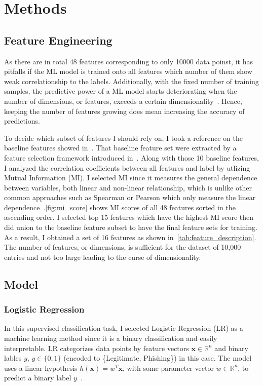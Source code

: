 \section{Methods}\label{sec:method}

\subsection{Feature Engineering}
As there are in total 48 features corresponding to only 10000 data poinst, it has pitfalls
if the ML model is trained onto all features which number of them show weak correlationship to
the labels. Additionally, with the fixed number of training samples, the predictive
power of a ML model starts deteriorating when the number of dimensions, or features, exceeds
a certain dimensionality~\cite{problem-dimension}. Hence, keeping the number of features growing
does mean increasing the accuracy of predictions.

To decide which subset of features I should rely on, I took a reference on the baseline features
showed in~\cite{CHIEW2019153}. That baseline feature set were extracted by a feature selection
framework introduced in~\cite{CHIEW2019153}. Along with those 10 baseline features, I analyzed
the correlation coefficients between all features and label by utlizing Mutual Information (MI).
I selected MI since it measures the general dependence between variables, both linear and non-linear
relationship, which is unlike other common approaches such as Spearman or Pearson which only measure
the linear dependence~\cite{MI-score}.\autoref{fig:mi_score} shows MI scores of all 48 features
sorted in the ascending order. I selected top 15 features which have the highest MI score then did
union to the baseline feature subset to have the final feature sets for training. As a result,
I obtained a set of 16 features as shown in~\autoref{tab:feature_description}. The number of
features, or dimensions, is sufficient for the dataset of 10,000 entries and not too large leading
to the curse of dimensionality.


\subsection{Model}
\subsubsection{Logistic Regression}
In this supervised classification task, I selected Logistic Regression (LR) as a machine learning method since it
is a binary classification and easily interpretable. LR categorizes data points by feature vectors
$\mathbf{x} \in \mathbb{R}^n$ and binary lables $y$, $y \in \{0,1\}$ (encoded to \{Legitimate, Phishing\}) in this case.
The model uses a linear hypothesis $h(\mathbf{x}) = w^T\mathbf{x}$, with some parameter vector
$w \in \mathbb{R}^n$, to predict a binary label $y$~\cite{ml-book}.

